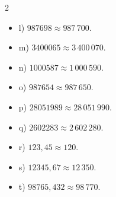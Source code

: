 \begin{bt}
{\begin{multicols}{2}
\begin{itemize}
			\item l) $987698 \approx 987\,700$.
			\item m) $3400065 \approx 3\,400\,070$.
			\item n) $1000587 \approx 1\,000\,590$.
			\item o) $987654 \approx 987\,650$.
			\item p) $28051989 \approx 28\,051\,990$.
			\item q) $2602283 \approx 2\,602\,280$.
			\item r) $123{,}45 \approx 120$.
			\item s) $12345{,}67 \approx 12\,350$.
			\item t) $98765{,}432 \approx 98\,770$.
		\end{itemize}
		\end{multicols}
	}
\end{bt}

